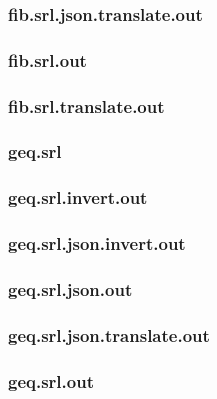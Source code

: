 \subsubsection{fib.srl.json.translate.out}
\label{app:fib_srl.json.translate.out}

\subsubsection{fib.srl.out}
\label{app:fib_srl.out}

\subsubsection{fib.srl.translate.out}
\label{app:fib_srl.translate.out}

\subsubsection{geq.srl}
\label{app:geq_srl}

\subsubsection{geq.srl.invert.out}
\label{app:geq_srl.invert.out}

\subsubsection{geq.srl.json.invert.out}
\label{app:geq_srl.json.invert.out}

\subsubsection{geq.srl.json.out}
\label{app:geq_srl.json.out}

\subsubsection{geq.srl.json.translate.out}
\label{app:geq_srl.json.translate.out}

\subsubsection{geq.srl.out}
\label{app:geq_srl.out}

